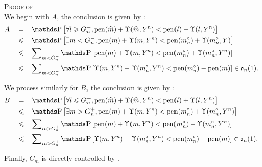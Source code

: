 \begin{pro}{\textsc{Proof of } \\}
We begin with $A$, the conclusion is given by :
\begin{alignat*}{3}
& A && = && \P\left[ \forall l \geq G^{-}_{n}, \pen(\widehat{m}) + \Upsilon(\widehat{m}, Y^{n}) < \pen(l) + \Upsilon(l, Y^{n}) \right]\\
& && \leq && \P\left[ \exists m < G^{-}_{n}, \pen(m) + \Upsilon(m, Y^{n}) < \pen(m^{\circ}_{n}) + \Upsilon(m^{\circ}_{n}, Y) \right]\\
& && \leq && \sum\nolimits_{m < G^{-}_{n}}\P\left[\pen(m) + \Upsilon(m, Y^{n}) < \pen(m^{\circ}_{n}) + \Upsilon(m^{\circ}_{n}, Y^{n}) \right]\\
& && \leq && \sum\nolimits_{m < G^{-}_{n}}\P\left[\Upsilon(m, Y^{n}) - \Upsilon(m^{\circ}_{n}, Y^{n}) < \pen(m^{\circ}_{n}) - \pen(m)\right] \in \mathfrak{o}_{n}(1).
\end{alignat*}

\medskip

We process similarly for $B$, the conclusion is given by :
\begin{alignat*}{4}
& B && = && \P\left[ \forall l \leq G^{+}_{n}, \pen(\widehat{m}) + \Upsilon(\widehat{m}, Y^{n}) < \pen(l) + \Upsilon(l, Y^{n}) \right]\\
& && \leq && \P\left[ \exists m > G^{+}_{n}, \pen(m) + \Upsilon(m, Y^{n}) < \pen(m^{\circ}_{n}) + \Upsilon(m^{\circ}_{n}, Y^{n}) \right]\\
& && \leq && \sum\nolimits_{m > G^{+}_{n}}\P\left[\pen(m) + \Upsilon(m, Y^{n}) < \pen(m^{\circ}_{n}) + \Upsilon(m^{\circ}_{n}, Y^{n}) \right]\\
& && \leq && \sum\nolimits_{m > G^{+}_{n}}\P\left[\Upsilon(m, Y^{n}) - \Upsilon(m^{\circ}_{n}, Y^{n}) < \pen(m^{\circ}_{n}) - \pen(m)\right] \in \mathfrak{o}_{n}(1).
\end{alignat*}

\medskip

Finally, $C_{m}$ is directly controlled by .

\proEnd
\end{pro}
